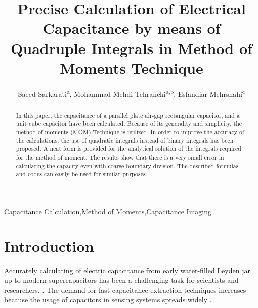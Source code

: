 \documentclass[final,5p,times,twocolumn]{elsarticle}
\begin{document}
\begin{frontmatter}

\title{Precise Calculation of Electrical Capacitance by means of Quadruple Integrals in  Method of Moments Technique}


\author{Saeed Sarkarati\textsuperscript{a}, Mohammad Mehdi Tehranchi\textsuperscript{a,b}, Esfandiar Mehrshahi\textsuperscript{c}}
\address{\textsuperscript{a}Laser and Plasma Research Institute, Shahid Beheshti University, Tehran, Iran}
\address{\textsuperscript{b}Department of Physics , Shahid Beheshti University, Tehran, Iran}
\address{\textsuperscript{c}Department of Electrical Engineering, Shahid Beheshti University, Tehran, Iran}



\begin{abstract}
In this paper, the capacitance of a parallel plate air-gap rectangular capacitor, and a unit cube capacitor have been calculated. Because of its generality and simplicity, the method of moments (MOM) Technique is utilized. In order to improve the accuracy of the calculations, the use of quadratic integrals instead of binary integrals has been proposed. A neat form is provided for the analytical solution of the integrals required for the method of moment. The results show that there is a very small error in calculating the capacity even with coarse boundary division. The described formulas and codes can easily be used for similar purposes.
\end{abstract}

\begin{keyword}
Capacitance Calculation\sep Method of Moments\sep Capacitance Imaging

\end{keyword}

\end{frontmatter}

\linenumbers

\section{Introduction}

Accurately calculating of electric capacitance from early water-filled Leyden jar up to modern supercapacitors has been a challenging task for scientists and researchers. \cite{Dubal2016}. The demand for fast capacitance extraction techniques increases because the usage of capacitors in sensing systems spreads widely \cite{Rahman2009}.
\end{document}
